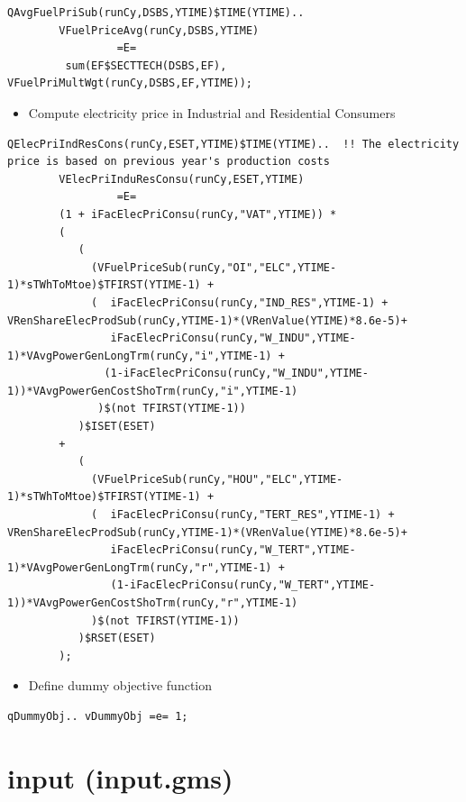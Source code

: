 \documentclass[a4paper,]{scrartcl}
\providecommand{\tightlist}{%
  \setlength{\itemsep}{0pt}\setlength{\parskip}{0pt}}
\begin{document}
\begin{lstlisting}
QAvgFuelPriSub(runCy,DSBS,YTIME)$TIME(YTIME)..
        VFuelPriceAvg(runCy,DSBS,YTIME)
                 =E=
         sum(EF$SECTTECH(DSBS,EF), VFuelPriMultWgt(runCy,DSBS,EF,YTIME));         
\end{lstlisting}

\begin{itemize}
\tightlist
\item
  Compute electricity price in Industrial and Residential Consumers
\end{itemize}

\begin{lstlisting}
QElecPriIndResCons(runCy,ESET,YTIME)$TIME(YTIME)..  !! The electricity price is based on previous year's production costs
        VElecPriInduResConsu(runCy,ESET,YTIME)
                 =E=
        (1 + iFacElecPriConsu(runCy,"VAT",YTIME)) *
        (
           (
             (VFuelPriceSub(runCy,"OI","ELC",YTIME-1)*sTWhToMtoe)$TFIRST(YTIME-1) +
             (  iFacElecPriConsu(runCy,"IND_RES",YTIME-1) + VRenShareElecProdSub(runCy,YTIME-1)*(VRenValue(YTIME)*8.6e-5)+
                iFacElecPriConsu(runCy,"W_INDU",YTIME-1)*VAvgPowerGenLongTrm(runCy,"i",YTIME-1) +
               (1-iFacElecPriConsu(runCy,"W_INDU",YTIME-1))*VAvgPowerGenCostShoTrm(runCy,"i",YTIME-1)
              )$(not TFIRST(YTIME-1))
           )$ISET(ESET)
        +
           (
             (VFuelPriceSub(runCy,"HOU","ELC",YTIME-1)*sTWhToMtoe)$TFIRST(YTIME-1) +
             (  iFacElecPriConsu(runCy,"TERT_RES",YTIME-1) + VRenShareElecProdSub(runCy,YTIME-1)*(VRenValue(YTIME)*8.6e-5)+
                iFacElecPriConsu(runCy,"W_TERT",YTIME-1)*VAvgPowerGenLongTrm(runCy,"r",YTIME-1) +
                (1-iFacElecPriConsu(runCy,"W_TERT",YTIME-1))*VAvgPowerGenCostShoTrm(runCy,"r",YTIME-1)
             )$(not TFIRST(YTIME-1))
           )$RSET(ESET)
        );
\end{lstlisting}

\begin{itemize}
\tightlist
\item
  Define dummy objective function
\end{itemize}

\begin{lstlisting}
qDummyObj.. vDummyObj =e= 1;
\end{lstlisting}

\pagebreak

\section{input (input.gms)}\label{id-input.gms}
\end{document}
